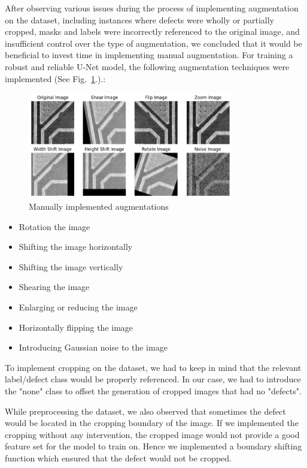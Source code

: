 \documentclass[12pt]{article}
\begin{document}
After observing various issues during the process of implementing augmentation on the dataset, including instances where defects were wholly or partially cropped, masks and labels were incorrectly referenced to the original image, and insufficient control over the type of augmentation, we concluded that it would be beneficial to invest time in implementing manual augmentation. For training a robust and reliable U-Net model, the following augmentation techniques were implemented (See Fig.~\ref{fig:manual_augmentation}.).:
\begin{figure}[h]
    \centering
    \includegraphics[width=0.8\textwidth]{./graphics/manual augmentation.png}
    \caption{Manually implemented augmentations}
    \label{fig:manual_augmentation}
\end{figure}

\begin{itemize}
    \item Rotation the image 
    \item Shifting the image horizontally  
    \item Shifting the image vertically  
    \item Shearing the image
    \item Enlarging or reducing  the image
    \item Horizontally flipping the image 
    \item Introducing Gaussian noise to the image
\end{itemize}

To implement cropping on the dataset, we had to keep in mind that the relevant label/defect class would be properly referenced. In our case, we had to introduce the "none" class to offset the generation of cropped images that had no "defects".

While preprocessing the dataset, we also observed that sometimes the defect would be located in the cropping boundary of the image. If we implemented the cropping without any intervention, the cropped image would not provide a good feature set for the model to train on. Hence we implemented a boundary shifting function which ensured that the defect would not be cropped.
\end{document}
